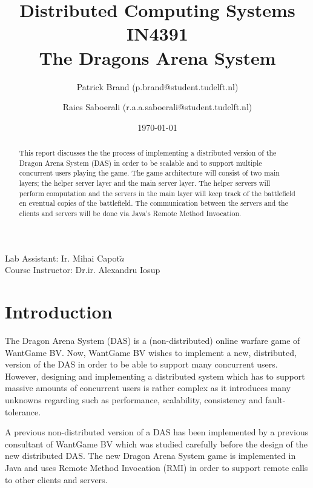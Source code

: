 \documentclass{article}
\title{Distributed Computing Systems IN4391\\ The Dragons Arena System %
}
\author{Patrick Brand (p.brand@student.tudelft.nl) \and
    Raies Saboerali (r.a.a.saboerali@student.tudelft.nl)
}
\date{\today}
\begin{document}
\maketitle
\thispagestyle{empty}
\begin{center}
Lab Assistant: Ir. Mihai Capot$\breve{a}$ \\
Course Instructor: Dr.ir. Alexandru Iosup
\end{center}

\begin{abstract}
This report discusses the the process of implementing a distributed version of the Dragon Arena System (DAS) in order to be scalable and to support multiple concurrent users playing the game.
The game architecture will consist of two main layers; the helper server layer and the main server layer.
The helper servers will perform computation and the servers in the main layer will keep track of the battlefield en eventual copies of the battlefield.
The communication between the servers and the clients and servers will be done via Java's Remote Method Invocation.
\end{abstract}


\section{Introduction}


The Dragon Arena System (DAS) is a (non-distributed) online warfare game of WantGame BV.
Now, WantGame BV wishes to implement a new, distributed, version of the DAS in order to be able to support many concurrent users.
However, designing and implementing a distributed system which has to support massive amounts of concurrent users is rather complex as it introduces many unknowns regarding such as performance, scalability, consistency and fault-tolerance.

A previous non-distributed version of a DAS has been implemented by a previous consultant of WantGame BV which was studied carefully before the design of the new distributed DAS.
The new Dragon Arena System game is implemented in Java and uses Remote Method Invocation (RMI) in order to support remote calls to other clients and servers.
\end{document}
